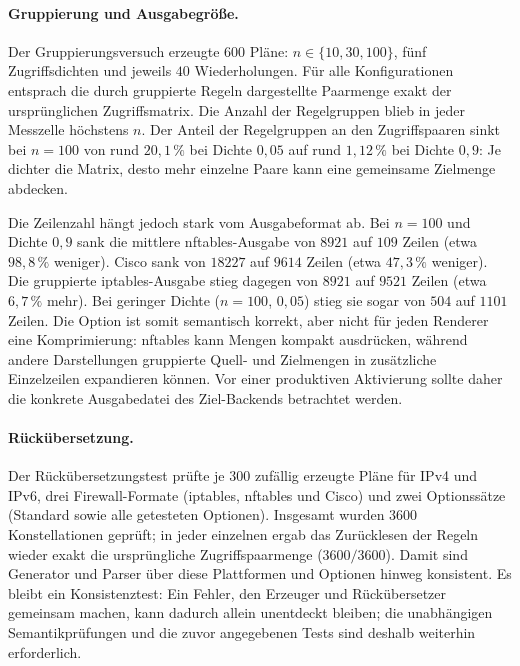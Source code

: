 \documentclass[a4paper,12pt, twoside]{report}
\theoremstyle{definition}
\begin{document}
\paragraph{Gruppierung und Ausgabegröße.}
Der Gruppierungsversuch erzeugte $600$ Pläne: $n\in\{10,30,100\}$, fünf Zugriffsdichten und jeweils $40$ Wiederholungen. Für alle Konfigurationen entsprach die durch gruppierte Regeln dargestellte Paarmenge exakt der ursprünglichen Zugriffsmatrix. Die Anzahl der Regelgruppen blieb in jeder Messzelle höchstens $n$. Der Anteil der Regelgruppen an den Zugriffspaaren sinkt bei $n=100$ von rund $20{,}1\,\%$ bei Dichte $0{,}05$ auf rund $1{,}12\,\%$ bei Dichte $0{,}9$: Je dichter die Matrix, desto mehr einzelne Paare kann eine gemeinsame Zielmenge abdecken.

Die Zeilenzahl hängt jedoch stark vom Ausgabeformat ab. Bei $n=100$ und Dichte $0{,}9$ sank die mittlere nftables-Ausgabe von $8921$ auf $109$ Zeilen (etwa $98{,}8\,\%$ weniger). Cisco sank von $18227$ auf $9614$ Zeilen (etwa $47{,}3\,\%$ weniger). Die gruppierte iptables-Ausgabe stieg dagegen von $8921$ auf $9521$ Zeilen (etwa $6{,}7\,\%$ mehr). Bei geringer Dichte ($n=100$, $0{,}05$) stieg sie sogar von $504$ auf $1101$ Zeilen. Die Option ist somit semantisch korrekt, aber nicht für jeden Renderer eine Komprimierung: nftables kann Mengen kompakt ausdrücken, während andere Darstellungen gruppierte Quell- und Zielmengen in zusätzliche Einzelzeilen expandieren können. Vor einer produktiven Aktivierung sollte daher die konkrete Ausgabedatei des Ziel-Backends betrachtet werden.

\paragraph{Rückübersetzung.}
Der Rückübersetzungstest prüfte je $300$ zufällig erzeugte Pläne für IPv4 und IPv6, drei Firewall-Formate (iptables, nftables und Cisco) und zwei Optionssätze (Standard sowie alle getesteten Optionen). Insgesamt wurden $3600$ Konstellationen geprüft; in jeder einzelnen ergab das Zurücklesen der Regeln wieder exakt die ursprüngliche Zugriffspaarmenge ($3600/3600$). Damit sind Generator und Parser über diese Plattformen und Optionen hinweg konsistent. Es bleibt ein Konsistenztest: Ein Fehler, den Erzeuger und Rückübersetzer gemeinsam machen, kann dadurch allein unentdeckt bleiben; die unabhängigen Semantikprüfungen und die zuvor angegebenen Tests sind deshalb weiterhin erforderlich.
\end{document}
